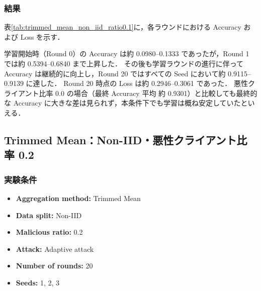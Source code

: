 \documentclass[a4j,twocolumn,dvipdfmx]{jsarticle}
\begin{document}
\subsubsection{結果}

表\ref{tab:trimmed_mean_non_iid_ratio0.1}に，各ラウンドにおける
Accuracy および Loss を示す．

学習開始時（Round 0）の Accuracy は約 0.0980--0.1333 であったが，Round 1 では約 0.5394--0.6840 まで上昇した． その後も学習ラウンドの進行に伴って Accuracy は継続的に向上し，Round 20 ではすべての Seed において約 0.9115--0.9139 に達した． Round 20 時点の Loss は約 0.2946--0.3061 であった． 悪性クライアント比率 0.0 の場合（最終 Accuracy 平均 約 0.9301）と比較しても最終的な Accuracy に大きな差は見られず，本条件下でも学習は概ね安定していたといえる．

\clearpage
\subsection{Trimmed Mean：Non-IID・悪性クライアント比率 0.2}

\subsubsection{実験条件}

\begin{itemize}
    \item \textbf{Aggregation method:} Trimmed Mean
    \item \textbf{Data split:} Non-IID
    \item \textbf{Malicious ratio:} 0.2
    \item \textbf{Attack:} Adaptive attack
    \item \textbf{Number of rounds:} 20
    \item \textbf{Seeds:} 1, 2, 3
\end{itemize}

\end{document}

